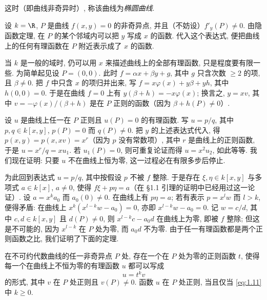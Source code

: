 \begin{definition}[椭圆曲线]\label{def:elliptic-curve}
	这时（即曲线非奇异时）, 称该曲线为\emph{椭圆曲线}.
\end{definition}

设 $k = \R$, $P$ 是曲线 $f(x,y) = 0$ 的非奇异点, 并且（不妨设）$f'_y(P) \ne 0$. 由隐函数定理, 在 $P$ 的某个邻域内可以把 $y$ 写成 $x$ 的函数. 代入这个表达式, 便把曲线上的任何有理函数在 $P$ 附近表示成了 $x$ 的函数.

当 $k$ 是一般的域时, 仍可以用 $x$ 来描述曲线上的全部有理函数, 只是程度要有限一些. 为简单起见设 $P = (0,0)$. 此时 $f = \alpha x + \beta y + g$, 其中 $g$ 只含次数 $\ge 2$ 的项, 且 $\beta \ne 0$. 把 $f$ 中只含 $x$ 的项归并出来, 写 $f = x\varphi(x) + y\beta + yh$, 其中 $h(0,0) = 0$. 于是在曲线 $f = 0$ 上有 $y(\beta + h) = -x\varphi(x)$; 换言之, $y = xv$, 其中 $v = -\varphi(x)/(\beta + h)$ 是在 $P$ 正则的函数（因为 $\beta + h(P) \ne 0$）.

设 $u$ 是曲线上任一在 $P$ 正则且 $u(P) = 0$ 的有理函数. 写 $u = p/q$, 其中 $p, q \in k[x,y]$, $p(P) = 0$ 而 $q(P) \ne 0$. 把 $y$ 的上述表达式代入, 得 $p(x,y) = p(x, xv) = x^r$（因为 $p$ 没有常数项）, 其中 $r$ 是曲线上的正则函数, 于是 $u = x^r / q = x u_1$. 若 $u_1(P) = 0$, 则可重复论证而得 $u = x^2 u_2$, 如此等等. 我们现在证明: 只要 $u$ 不在曲线上恒为零, 这一过程必在有限多步后停止.

为此回到表达式 $u = p/q$, 其中按假设 $p$ 不被 $f$ 整除. 于是存在 $\xi, \eta \in k[x,y]$ 与多项式 $a \in k[x]$, $a \ne 0$, 使得 $f\xi + p\eta = a$（在 §1.1 引理的证明中已经用过这一论证）. 设 $a = x^k a_0$ 而 $a_0(0) \ne 0$. 在曲线上有 $p\eta = a$; 若有表示 $p = x^l w$ 而 $l > k$, 便得矛盾: 在曲线上 $x^k (x^{l-k} w - a_0) = 0$, 亦即 $x^{l-k} w - a_0 = 0$. 记 $w = c/d$, 其中 $c, d \in k[x,y]$ 且 $d(P) \ne 0$, 则 $x^{l-k} c - a_0 d$ 在曲线上为零, 即被 $f$ 整除; 但这是不可能的, 因为 $x^{l-k}$ 在 $P$ 处为零, 而 $a_0 d$ 不为零. 由于任一有理函数都是两个正则函数之比, 我们证明了下面的定理.

\begin{theorem}\label{thm:local-parameter}
	在不可约代数曲线的任一非奇异点 $P$ 处, 存在一个在 $P$ 处为零的正则函数 $t$, 使得每一个在曲线上不恒为零的有理函数 $u$ 都可以写成
	\begin{equation}
		\label{eq:1.11}
		u = t^k v
	\end{equation}
	的形式, 其中 $v$ 在 $P$ 处正则且 $v(P) \ne 0$. 函数 $u$ 在 $P$ 处正则, 当且仅当 \eqref{eq:1.11} 中 $k \ge 0$.
\end{theorem}

